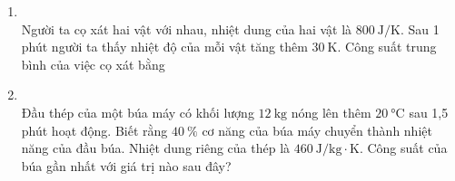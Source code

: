 \begin{enumerate}[label=\bfseries Câu \arabic*:, leftmargin=1.7cm]
\item {}\\
Người ta cọ xát hai vật với nhau, nhiệt dung của hai vật là $\SI{800}{\joule/\kelvin}$. Sau 1 phút người ta thấy nhiệt độ của mỗi vật tăng thêm $\SI{30}{\kelvin}$. Công suất trung bình của việc cọ xát bằng

\item {}\\
Đầu thép của một búa máy có khối lượng $\SI{12}{\kilogram}$ nóng lên thêm $\SI{20}{\celsius}$ sau 1,5 phút hoạt động. Biết rằng  $\SI{40}{\percent}$ cơ năng của búa máy chuyển thành nhiệt năng của đầu búa. Nhiệt dung riêng của thép là $\SI{460}{\joule/\kilogram\cdot\kelvin}$. Công suất của búa gần nhất với giá trị nào sau đây?


\end{enumerate}
